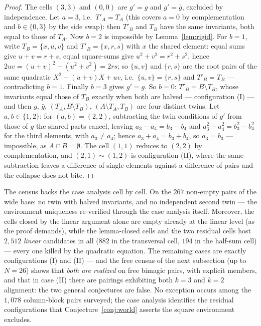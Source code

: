 \documentclass[11pt]{article}
\begin{document}
\begin{proof}
The cells $(3,3)$ and $(0,0)$ are $g'=g$ and $g'=\bar g$, excluded by
independence. Let $a=3$, i.e.\ $T'_A=T_A$ (this covers $a=0$ by
complementation and $b\in\{0,3\}$ by the side swap): then $T'_B$ and
$T_B$ have the same invariants, both equal to those of $T_A$. Now
$b=2$ is impossible by Lemma~\ref{lem:rigid}. For $b=1$, write
$T_B=\{x,u,v\}$ and $T'_B=\{x,r,s\}$ with $x$ the shared element:
equal sums give $u+v=r+s$, equal square-sums give
$u^2+v^2=r^2+s^2$, hence $2uv=(u+v)^2-(u^2+v^2)=2rs$; so $\{u,v\}$
and $\{r,s\}$ are the root pairs of the same quadratic
$X^2-(u+v)X+uv$, i.e.\ $\{u,v\}=\{r,s\}$ and $T'_B=T_B$ ---
contradicting $b=1$. Finally $b=3$ gives $g'=g$. So $b=0$:
$T'_B=B\setminus T_B$, whose invariants equal those of $T_B$ exactly
when both are halved --- configuration (I) --- and then $g$, $\bar g$,
$(T_A,B\setminus T_B)$, $(A\setminus T_A,T_B)$ are four distinct
twins. Let $a,b\in\{1,2\}$: for $(a,b)=(2,2)$, subtracting the twin
conditions of $g'$ from those of $g$ the shared parts cancel, leaving
$a_3-a_4=b_3-b_4$ and $a_3^2-a_4^2=b_3^2-b_4^2$ for the third
elements, with $a_3\ne a_4$; hence $a_3+a_4=b_3+b_4$, so $a_3=b_3$
--- impossible, as $A\cap B=\emptyset$. The cell $(1,1)$ reduces to
$(2,2)$ by complementation, and $(2,1)\sim(1,2)$ is configuration
(II), where the same subtraction leaves a difference of single
elements against a difference of pairs and the collapse does not
bite.
\end{proof}

The census backs the case analysis cell by cell. On the $267$
non-empty pairs of the wide base: no twin with halved invariants, and
no independent second twin --- the environment uniqueness re-verified
through the case analysis itself. Moreover, the cells closed by the
linear argument alone are empty already at the linear level (as the
proof demands), while the lemma-closed cells and the two residual
cells host $2{,}512$ \emph{linear} candidates in all ($882$ in the
transversal cell, $194$ in the half-sum cell) --- every one killed by
the quadratic equation. The remaining cases are exactly
configurations (I) and (II) --- and the free census of the next
subsection (up to $N=26$) shows that \emph{both are realized} on
free bimagic pairs, with explicit members, and that in case (II)
there are pairings exhibiting both $k=3$ and $k=2$ alignment: the
two general conjectures are false. No exception occurs among the
$1{,}078$ column-block pairs surveyed; the case analysis identifies
the residual configurations that Conjecture~\ref{conj:world} asserts
the square environment excludes.
\end{document}
